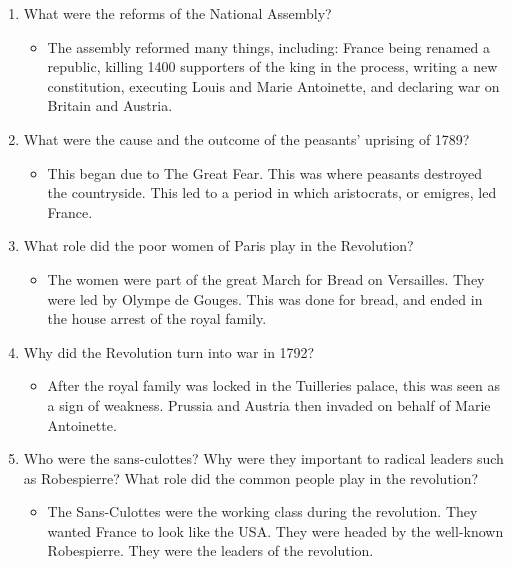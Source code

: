 \documentclass[12pt]{article}
\begin{document}
\begin{enumerate}
\item What were the reforms of the National Assembly?

	\begin{itemize}
	\item The assembly reformed many things, including: France being renamed a republic, killing 1400 supporters of the king in the process, writing a new constitution, executing Louis and Marie Antoinette, and declaring war on Britain and Austria.
	\end{itemize}

\item What were the cause and the outcome of the peasants' uprising of 1789?

	\begin{itemize}
	\item This began due to The Great Fear. This was where peasants destroyed the countryside. This led to a period in which aristocrats, or emigres, led France.
	\end{itemize}

\item What role did the poor women of Paris play in the Revolution?

	\begin{itemize}
	\item The women were part of the great March for Bread on Versailles. They were led by Olympe de Gouges. This was done for bread, and ended in the house arrest of the royal family.
	\end{itemize}

\item Why did the Revolution turn into war in 1792?

	\begin{itemize}
	\item After the royal family was locked in the Tuilleries palace, this was seen as a sign of weakness. Prussia and Austria then invaded on behalf of Marie Antoinette.
	\end{itemize}

\item Who were the sans-culottes? Why were they important to radical leaders such as Robespierre? What role did the common people play in the revolution?

	\begin{itemize}
	\item The Sans-Culottes were the working class during the revolution. They wanted France to look like the USA. They were headed by the well-known Robespierre. They were the leaders of the revolution.
	\end{itemize}


\end{enumerate}
\end{document}
